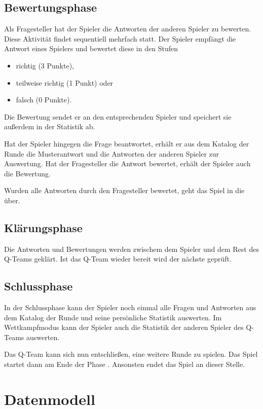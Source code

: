 \documentclass[a4paper,11pt,listof=numbered,glossary=totoc,parskip=half,toc=bib]{scrreprt}
\begin{document}
	\subsection{Bewertungsphase}
	\label{subsec:bewertungsphase}
	Als Fragesteller hat der Spieler die Antworten der anderen Spieler zu bewerten. Diese Aktivität findet sequentiell mehrfach statt. Der Spieler empfängt die Antwort eines Spielers und bewertet diese in den Stufen
	\begin{itemize}
	\item richtig (3 Punkte),
	\item teilweise richtig (1 Punkt) oder
	\item falsch (0 Punkte).
	\end{itemize}
	Die Bewertung sendet er an den entsprechenden Spieler und speichert sie außerdem in der Statistik ab.
	
	Hat der Spieler hingegen die Frage beantwortet, erhält er aus dem Katalog der Runde die Musterantwort und die Antworten der anderen Spieler zur Auswertung. Hat der Fragesteller die Antwort bewertet, erhält der Spieler auch die Bewertung.
	
	Wurden alle Antworten durch den Fragesteller bewertet, geht das Spiel in die  über.
	
	\subsection{Klärungsphase}
	\label{subsec:klaerungsphase}
	Die Antworten und Bewertungen werden zwischem dem Spieler und dem Rest des Q-Teams geklärt. Ist das Q-Team wieder bereit wird der nächste  geprüft.
	
	\subsection{Schlussphase}
	\label{subsec:schlussphase}
	In der Schlussphase kann der Spieler noch einmal alle Fragen und Antworten aus dem Katalog der Runde  und seine persönliche Statistik auswerten. Im Wettkampfmodus kann der Spieler auch die Statistik der anderen Spieler des Q-Teams auswerten.
	
	Das Q-Team kann sich nun entschließen, eine weitere Runde zu spielen. Das Spiel startet dann am Ende der Phase \textit{}. Ansonsten endet das Spiel an dieser Stelle.
	 
	
	\section{Datenmodell}
	
\end{document}
